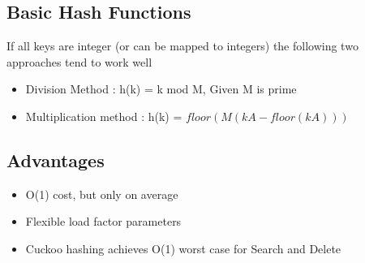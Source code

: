 \documentclass{article}
\begin{document}
\subsection*{Basic Hash Functions}
If all keys are integer (or can be mapped to integers) the following two approaches tend to work well 

\begin{itemize}
\item Division Method : h(k) = k mod M, Given M is prime 
\item Multiplication method : h(k) = \(floor(M(kA - floor(kA)))\)
\end{itemize}

\subsection*{Advantages}
\begin{itemize}
\item O(1) cost, but only on average
\item Flexible load factor parameters
\item Cuckoo hashing achieves O(1) worst case for Search and Delete 
\end{itemize}
\end{document}
